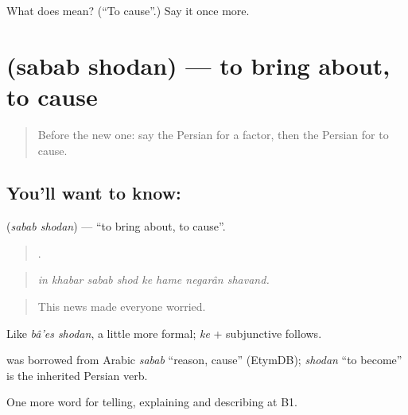 \begin{tcolorbox}[breakable,colback=teal!4,colframe=teal!35!black,title={Before you move on}]
What does   mean? (\textquotedblleft{}To cause\textquotedblright{}.) Say it once more.
\end{tcolorbox}
\section[\texorpdfstring{\fa{سبب} \fa{شدن} (sabab shodan)}{سبب شدن (sabab shodan)}]{  (sabab shodan) — to bring about, to cause}

\label{lesson:FA-C369-sabab-shodan}



\begin{quote}
Before the new one: say the Persian for a factor, then the Persian for to cause.
\end{quote}

\subsection*{You'll want to know:  }
\textbf{ } (\emph{sabab shodan}) — \textquotedblleft{}to bring about, to cause\textquotedblright{}.

\begin{quote}
       .
\end{quote}

\begin{quote}
\emph{in khabar sabab shod ke hame negarân shavand.}
\end{quote}

\begin{quote}
This news made everyone worried.
\end{quote}

Like \emph{bâ'es shodan}, a little more formal; \emph{ke} + subjunctive follows.

\begin{cousinweb}
\textbf{} was borrowed from Arabic \emph{sabab} \textquotedblleft{}reason, cause\textquotedblright{} (EtymDB); \emph{shodan} \textquotedblleft{}to become\textquotedblright{} is the inherited Persian verb.
\end{cousinweb}

\begin{grammarlens}[title={What you've built}]
One more word for telling, explaining and describing at B1.
\end{grammarlens}

